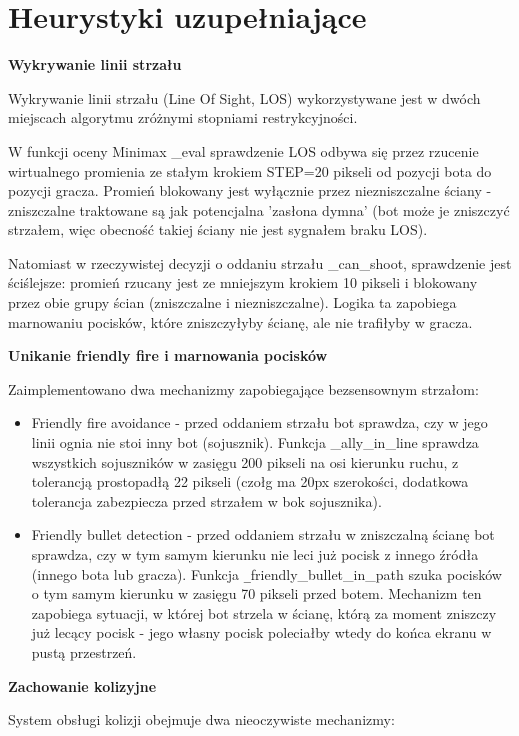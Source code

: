 \section{Heurystyki uzupełniające}
\textbf{Wykrywanie linii strzału}

Wykrywanie linii strzału (Line Of Sight, LOS) wykorzystywane jest w dwóch miejscach algorytmu 
zróżnymi stopniami restrykcyjności.
 
W funkcji oceny Minimax \_eval sprawdzenie LOS odbywa się przez rzucenie wirtualnego promienia ze stałym
krokiem STEP=20 pikseli od pozycji bota do pozycji gracza. Promień blokowany jest wyłącznie przez niezniszczalne 
ściany - zniszczalne traktowane są jak potencjalna 'zasłona dymna' (bot może je zniszczyć strzałem, 
więc obecność takiej ściany nie jest sygnałem braku LOS).
 
Natomiast w rzeczywistej decyzji o oddaniu strzału \_can\_shoot,
sprawdzenie jest ściślejsze: promień rzucany jest ze mniejszym krokiem 10 pikseli i blokowany przez obie grupy ścian 
(zniszczalne i niezniszczalne). Logika ta zapobiega marnowaniu pocisków, które zniszczyłyby  ścianę, ale nie trafiłyby w gracza.

\textbf{Unikanie friendly fire i marnowania pocisków}

Zaimplementowano dwa mechanizmy zapobiegające bezsensownym strzałom:

\begin{itemize}
\item Friendly fire avoidance - przed oddaniem strzału bot sprawdza, czy w jego linii ognia nie 
stoi inny bot (sojusznik). Funkcja \_ally\_in\_line sprawdza wszystkich sojuszników w zasięgu 200 pikseli na osi 
kierunku ruchu, z tolerancją prostopadłą 22 pikseli (czołg ma 20px szerokości, dodatkowa tolerancja 
zabezpiecza przed strzałem w bok sojusznika).
\item Friendly bullet detection - przed oddaniem strzału w zniszczalną ścianę bot sprawdza, czy w tym samym kierunku 
nie leci już pocisk z innego źródła (innego bota lub gracza). Funkcja \texttt\_friendly\_bullet\_in\_path szuka pocisków 
o tym samym kierunku w zasięgu 70 pikseli przed botem. Mechanizm ten zapobiega sytuacji, w której bot strzela w ścianę, którą 
za moment zniszczy już lecący pocisk - jego własny pocisk poleciałby wtedy do końca ekranu w pustą przestrzeń.
\end{itemize}

\textbf{Zachowanie kolizyjne}

System obsługi kolizji obejmuje dwa nieoczywiste mechanizmy:
 
